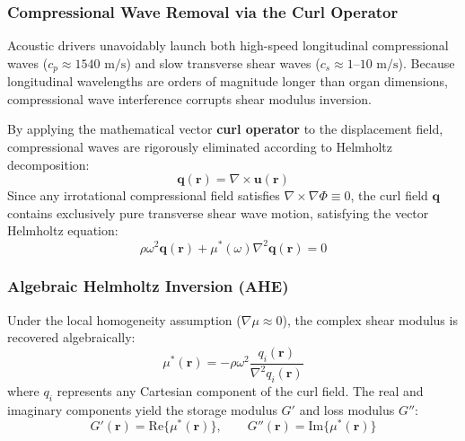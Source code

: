 \documentclass[11pt,a4paper]{article}
\begin{document}
\subsubsection{Compressional Wave Removal via the Curl Operator}
Acoustic drivers unavoidably launch both high-speed longitudinal compressional waves ($c_p \approx 1540\text{ m/s}$) and slow transverse shear waves ($c_s \approx 1\text{--}10\text{ m/s}$). Because longitudinal wavelengths are orders of magnitude longer than organ dimensions, compressional wave interference corrupts shear modulus inversion. 

By applying the mathematical vector \textbf{curl operator} to the displacement field, compressional waves are rigorously eliminated according to Helmholtz decomposition:
\begin{equation}
    \mathbf{q}(\mathbf{r}) = \nabla \times \mathbf{u}(\mathbf{r})
\end{equation}
Since any irrotational compressional field satisfies $\nabla \times \nabla \Phi \equiv 0$, the curl field $\mathbf{q}$ contains exclusively pure transverse shear wave motion, satisfying the vector Helmholtz equation:
\begin{equation}
    \rho \omega^2 \mathbf{q}(\mathbf{r}) + \mu^*(\omega) \nabla^2 \mathbf{q}(\mathbf{r}) = 0
\end{equation}

\subsubsection{Algebraic Helmholtz Inversion (AHE)}
Under the local homogeneity assumption ($\nabla \mu \approx 0$), the complex shear modulus is recovered algebraically:
\begin{equation}
    \mu^*(\mathbf{r}) = -\rho \omega^2 \frac{q_i(\mathbf{r})}{\nabla^2 q_i(\mathbf{r})}
\end{equation}
where $q_i$ represents any Cartesian component of the curl field. The real and imaginary components yield the storage modulus $G'$ and loss modulus $G''$:
\begin{equation}
    G'(\mathbf{r}) = \text{Re}\{\mu^*(\mathbf{r})\}, \qquad G''(\mathbf{r}) = \text{Im}\{\mu^*(\mathbf{r})\}
\end{equation}
\end{document}
